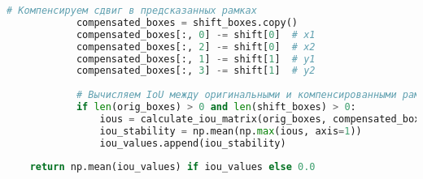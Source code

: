 \begin{lstlisting}[language=Python]
            # Компенсируем сдвиг в предсказанных рамках
            compensated_boxes = shift_boxes.copy()
            compensated_boxes[:, 0] -= shift[0]  # x1
            compensated_boxes[:, 2] -= shift[0]  # x2
            compensated_boxes[:, 1] -= shift[1]  # y1
            compensated_boxes[:, 3] -= shift[1]  # y2
            
            # Вычисляем IoU между оригинальными и компенсированными рамками
            if len(orig_boxes) > 0 and len(shift_boxes) > 0:
                ious = calculate_iou_matrix(orig_boxes, compensated_boxes)
                iou_stability = np.mean(np.max(ious, axis=1))
                iou_values.append(iou_stability)
    
    return np.mean(iou_values) if iou_values else 0.0
\end{lstlisting}

